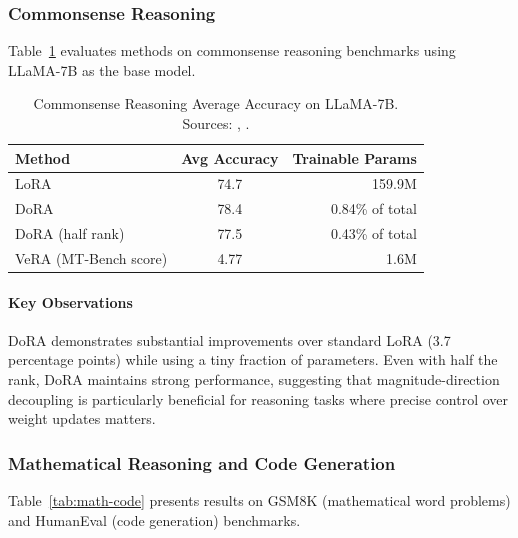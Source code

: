 \subsubsection{Commonsense Reasoning}

Table~\ref{tab:commonsense-llama} evaluates methods on commonsense reasoning benchmarks using LLaMA-7B as the base model.

\begin{table}[H]
  \centering
  \caption{Commonsense Reasoning Average Accuracy on LLaMA-7B. Sources: \cite{liu2024dora}, \cite{kopiczko2023vera}.}
  \label{tab:commonsense-llama}
  \begin{tabular}{lcr}
    \toprule
    Method & Avg Accuracy & Trainable Params \\
    \midrule
    LoRA & 74.7 & 159.9M \\
    DoRA & 78.4 & 0.84\% of total \\
    DoRA (half rank) & 77.5 & 0.43\% of total \\
    VeRA (MT-Bench score) & 4.77 & 1.6M \\
    \bottomrule
  \end{tabular}
\end{table}

\paragraph{Key Observations}
DoRA demonstrates substantial improvements over standard LoRA (3.7 percentage points) while using a tiny fraction of parameters. Even with half the rank, DoRA maintains strong performance, suggesting that magnitude-direction decoupling is particularly beneficial for reasoning tasks where precise control over weight updates matters.

\subsubsection{Mathematical Reasoning and Code Generation}

Table~\ref{tab:math-code} presents results on GSM8K (mathematical word problems) and HumanEval (code generation) benchmarks.


